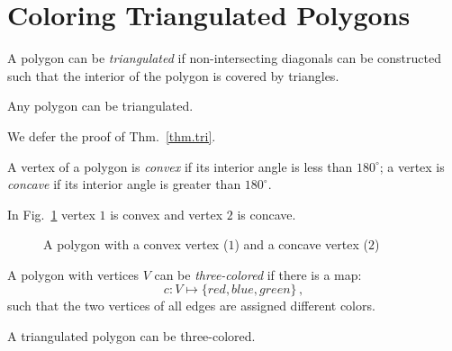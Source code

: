 \section{Coloring Triangulated Polygons}\label{s.museum-triangulating}

\begin{definition} A polygon can be \emph{triangulated} if non-intersecting diagonals can be constructed such that the interior of the polygon is covered by triangles.
\end{definition}
\vspace{-2ex}
\begin{theorem}
Any polygon can be triangulated.\label{thm.tri}
\end{theorem}
We defer the proof of Thm.~\ref{thm.tri}.
\begin{definition}
A vertex of a polygon is \emph{convex} if its interior angle is less than $180^\circ$; a vertex is \emph{concave} if its interior angle is greater than $180^\circ$. 
\end{definition}
In Fig.~\ref{f.museum.arbitrary} vertex $1$ is convex and vertex $2$ is concave.

\begin{figure}[ht]
\begin{center}
\end{center}
\caption{A polygon with a convex vertex ($1$) and a concave vertex ($2$)}\label{f.museum.arbitrary}
\end{figure}

\begin{definition}
A polygon with vertices $V$ can be \emph{three-colored} if there is a map:
\[c: V \mapsto \{\mathit{red},\mathit{blue},\mathit{green}\}\,,\] such that the two vertices of all edges are assigned different colors.
\end{definition}

\begin{theorem}
A triangulated polygon can be three-colored.\label{thm.colored}
\end{theorem}


